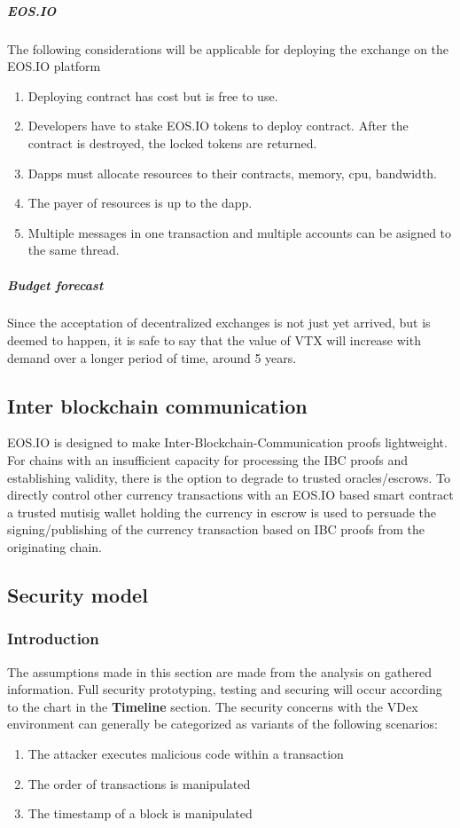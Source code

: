 \documentclass[]{article}
\begin{document}
\subparagraph{EOS.IO}
The following considerations will be applicable for deploying the exchange on the EOS.IO platform
\begin{enumerate}
\item Deploying contract has cost but is free to use. 
\item Developers have to stake EOS.IO tokens to deploy contract.
After the contract is destroyed, the locked tokens are returned.
\item Dapps must allocate resources to their contracts, memory, cpu, bandwidth. 
\item The payer of resources is up to the dapp.
\item Multiple messages in one transaction and multiple accounts can be asigned to the same thread.

\end{enumerate}

\subparagraph{Budget forecast}
Since the acceptation of decentralized exchanges is not just yet arrived,
but is deemed to happen, it is safe to say that the value of VTX will increase with demand over a longer period of time, around 5 years.

\subsection{Inter blockchain communication}
EOS.IO is designed to make Inter-Blockchain-Communication proofs lightweight. For chains with an insufficient capacity for processing the  IBC proofs and establishing validity, 
there is the option to degrade to trusted oracles/escrows.
To directly control other currency transactions with an
EOS.IO based smart contract a trusted mutisig wallet holding the currency 
in escrow is used to persuade the signing/publishing of the currency 
transaction based on IBC proofs from the originating chain.	
\subsection{Security model}
\subsubsection{Introduction}
The assumptions made in this section are made from the analysis on gathered information. Full security prototyping, testing and securing will occur according to the chart in the \textbf{Timeline} section. 
The security concerns with the VDex environment can generally be categorized as variants of the following scenarios:
	\begin{enumerate}
		\item The attacker executes malicious code within a transaction
		\item The order of transactions is manipulated
		\item The timestamp of a block is manipulated
	\end{enumerate}
\end{document}
